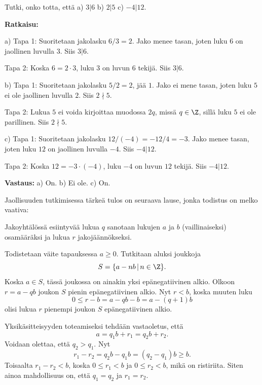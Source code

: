 \begin{esimerkki}
 Tutki, onko totta, että a)  $3 | 6$  b)  $2 | 5$ c) $-4|12$.

{\bf Ratkaisu:}

a) Tapa 1: Suoritetaan jakolasku $6/3= 2$. Jako menee tasan, joten luku $6$ on jaollinen luvulla $3$. Siis $3 | 6$.

Tapa 2: Koska $6 = 2 \cdot 3$, luku $3$ on luvun $6$ tekijä. Siis $3 | 6$.

b) Tapa 1: Suoritetaan jakolasku $5/2 = 2$, jää $1$. Jako ei mene tasan, joten luku $5$ ei ole jaollinen luvulla $2$. Siis $2 \nmid 5$.

Tapa 2: Lukua $5$ ei voida kirjoittaa muodossa $2q$, missä $q\in\Z$, sillä luku $5$ ei ole parillinen. Siis $2 \nmid 5$.

c) 
Tapa 1: Suoritetaan jakolasku $12/(-4)=-12/4= -3$. Jako menee tasan, joten luku $12$ on jaollinen luvulla $-4$. Siis $-4 | 12$.

Tapa 2: Koska $12 = -3 \cdot (-4)$, luku $-4$ on luvun $12$ tekijä. Siis $-4 | 12$.

{\bf Vastaus:} a) On.  b) Ei ole. c) On.
\end{esimerkki}

Jaollisuuden tutkimisessa tärkeä tulos on seuraava lause, jonka todistus on melko vaativa:


Jakoyhtälössä esiintyvää lukua $q$ sanotaan lukujen $a$ ja $b$ (vaillinaiseksi) osamääräksi ja lukua $r$  jakojäännökseksi.


\begin{todistus}%
Todistetaan väite tapauksessa $a\ge 0$. Tutkitaan aluksi joukkoja
\[
S = \{ a-nb\,|\, n\in \Z\}.
\]
Koska $a\in S$, tässä joukossa on ainakin yksi epänegatiivinen alkio. Olkoon $r=a-qb$ joukon $S$ pienin epänegatiivinen alkio. Nyt $r < b$, koska muuten luku 
\[
0\le r - b = a - qb - b = a - (q+1)b 
\]
olisi lukua $r$ pienempi joukon $S$ epänegatiivinen alkio.

Yksikäsitteisyyden toteamiseksi tehdään vastaoletus, että
\[
a= q_1b+r_1 = q_2b+r_2.
\]
Voidaan olettaa, että $q_2>q_1$. Nyt
\[
r_1 - r_2 = q_2b - q_1b = (q_2-q_1)b \ge b.
\]
Toisaalta $r_1-r_2<b$, koska $0\le r_1 < b$ ja $0\le r_2 < b$, mikä on ristiriita. Siten ainoa mahdollisuus on, että $q_1=q_2$ ja $r_1=r_2$. 
\end{todistus}

